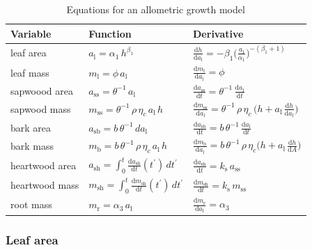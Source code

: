 \documentclass[12pt, a4paper]{article}
\begin{document}
\begin{table}[h]
\caption{Equations for an allometric growth model}
\centering

\begin{tabular}{p{5cm}p{5cm}p{5cm} }
\\ \hline
Variable & Function & Derivative\\ \hline
leaf area & $a_\textrm{l}=\alpha_1 \, h^{\beta_1}$ & $\frac{\textrm{d}h}{\textrm{d}a_\textrm{l}}= -\beta_1\big(\frac{a_\textrm{l}}{\alpha_1}\big)^{-(\beta_1+1)}$\\
leaf mass & $m_\textrm{l}=\phi \, a_\textrm{l} $ & $\frac{\textrm{d}m_\textrm{l}}{\textrm{d}a_\textrm{l}}=\phi$\\
sapwoood area & $a_\textrm{ss}=\theta^{-1} \, a_\textrm{l}$ & $\frac{\textrm{d}a_\textrm{ss}}{\textrm{d}t} =\theta^{-1} \, \frac{\textrm{d}a_\textrm{l}}{\textrm{d}t}$\\
sapwood mass&$m_\textrm{ss}=\theta^{-1} \, \rho \, \eta_c \, a_\textrm{l} \, h $ & $\frac{\textrm{d}m_\textrm{ss}}{\textrm{d}a_\textrm{l}}=\theta^{-1}\, \rho\, \eta_c\, \big( h + a_\textrm{l}\, \frac{\textrm{d}h}{\textrm{d}a_\textrm{l}} \big)$\\
bark area & $a_\textrm{sb}=b \, \theta^{-1} \, da_\textrm{l}$ & $\frac{\textrm{d}a_\textrm{sb}}{\textrm{d}t}=b \, \theta^{-1} \, \frac{\textrm{d}a_\textrm{l}}{\textrm{d}t}$\\
bark mass&$m_\textrm{b}=b\, \theta^{-1} \, \rho \, \eta_c \, a_\textrm{l} \, h $ & $\frac{\textrm{d}m_\textrm{b}}{\textrm{d}a_\textrm{l}}=b \, \theta^{-1} \, \rho \, \eta_c\big( h + a_\textrm{l} \, \frac{\textrm{d}h}{\textrm{d}A} \big)$\\
heartwood area & $a_\textrm{sh}=\int_0^t \frac{\textrm{d}a_\textrm{sh}}{\textrm{d}t}(t^\prime) \, dt^\prime$ & $\frac{\textrm{d}a_\textrm{sh}}{\textrm{d}t}=k_\textrm{s} \, a_\textrm{ss}$\\
heartwood mass & $m_\textrm{sh}=\int_0^t \frac{\textrm{d}m_\textrm{sh}}{\textrm{d}t}(t^\prime) \, dt^\prime$ & $\frac{\textrm{d}m_\textrm{sh}}{\textrm{d}t}=k_\textrm{s} \, m_\textrm{ss}$\\
root mass & $m_\textrm{r}=\alpha_3 \, a_\textrm{l}$ & $\frac{\textrm{d}m_\textrm{r}}{\textrm{d}a_\textrm{l}}= \alpha_3$ \\\hline
\end{tabular}
\label{tab:allometry}
\end{table}

\subsubsection{Leaf area}\label{leaf-area}
\end{document}
